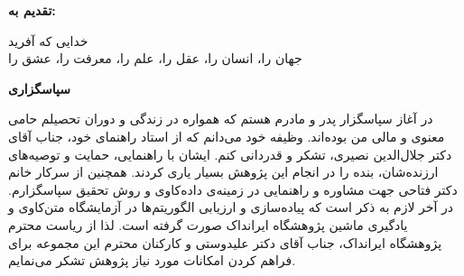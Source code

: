 \thispagestyle{empty}

\noindent
\textbf{\Large تقدیم به:}
\vskip 1cm

\noindent خدایی که آفرید \\
جهان را، انسان را، عقل را، علم را، معرفت را، عشق را

\newpage
\thispagestyle{empty}

\begin{center}
\textbf{\Large سپاسگزاری}
\end{center}
\vskip 1cm
\noindent در آغاز سپاسگزار پدر و مادرم هستم که همواره در زندگی و دوران تحصیلم حامی معنوی و مالی من بوده‌اند. وظیفه خود می‌دانم  که از استاد راهنمای خود، جناب آقای دکتر جلال‌الدین نصیری، تشکر و قدردانی کنم. ایشان با راهنمایی، حمایت و توصیه‌های ارزنده‌شان، بنده را در انجام این پژوهش بسیار یاری کردند. همچنین از سرکار خانم دکتر فتاحی  جهت مشاوره و راهنمایی در زمینه‌ی داده‌کاوی و روش تحقیق سپاسگزارم. در آخر لازم به ذکر است که پیاده‌سازی و ارزیابی الگوریتم‌ها در آزمایشگاه متن‌کاوی و یادگیری ماشین  پژوهشگاه ایرانداک صورت گرفته است. لذا از ریاست محترم پژوهشگاه ایرانداک، جناب آقای دکتر علیدوستی و کارکنان محترم این مجموعه برای فراهم کردن امکانات مورد نیاز پژوهش تشکر می‌نمایم. 

\vskip 1cm
